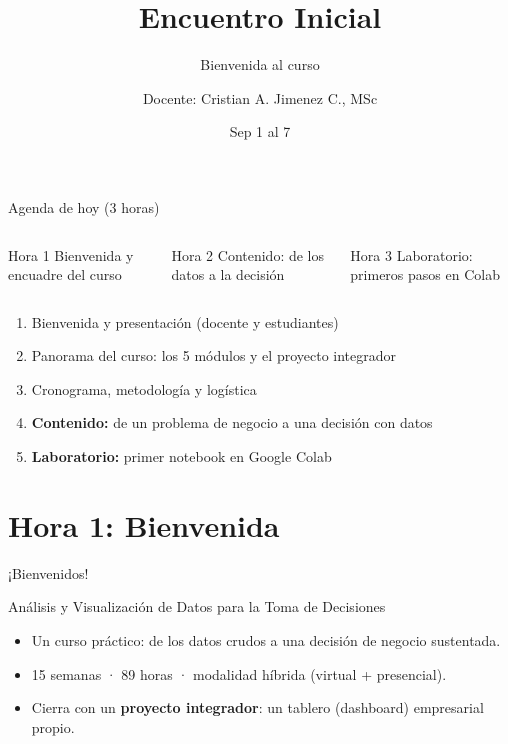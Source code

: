 \documentclass[aspectratio=169,11pt]{beamer}
\title{Encuentro Inicial}
\subtitle{Bienvenida al curso}
\author{Docente: Cristian A. Jimenez C., MSc}
\date{Sep 1 al 7}
\begin{document}
{
\begin{frame}[plain]
  \titlepage
\end{frame}
}

\begin{frame}{Agenda de hoy (3 horas)}
  \begin{columns}[T,onlytextwidth]
    \begin{block}{Hora 1}
      \small
      Bienvenida y encuadre del curso
    \end{block}
    \begin{block}{Hora 2}
      \small
      Contenido: de los datos a la decisión
    \end{block}
    \begin{block}{Hora 3}
      \small
      Laboratorio: primeros pasos en Colab
    \end{block}
  \end{columns}
  \vspace{0.5cm}
  \begin{enumerate}
    \small
    \item Bienvenida y presentación (docente y estudiantes)
    \item Panorama del curso: los 5 módulos y el proyecto integrador
    \item Cronograma, metodología y logística
    \item \textbf{Contenido:} de un problema de negocio a una decisión con datos
    \item \textbf{Laboratorio:} primer notebook en Google Colab
  \end{enumerate}
\end{frame}

\section{Hora 1: Bienvenida}
\begin{frame}{¡Bienvenidos!}
  \begin{block}{Análisis y Visualización de Datos para la Toma de Decisiones}
    \begin{itemize}
      \item Un curso práctico: de los datos crudos a una decisión de negocio sustentada.
      \item 15 semanas · 89 horas · modalidad híbrida (virtual + presencial).
      \item Cierra con un \textbf{proyecto integrador}: un tablero (dashboard) empresarial propio.
    \end{itemize}
  \end{block}
\end{frame}
\end{document}
